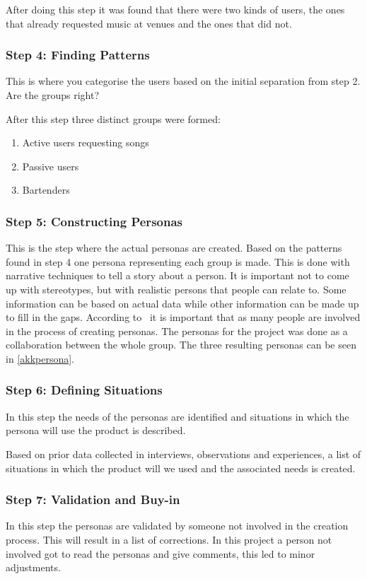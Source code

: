 After doing this step it was found that there were two kinds of users, the ones that already requested music at venues and the ones that did not.

\subsubsection{Step 4: Finding Patterns}
This is where you categorise the users based on the initial separation from step 2. Are the groups right?

After this step three distinct groups were formed:
\begin{enumerate}
    \item Active users requesting songs
    \item Passive users
    \item Bartenders
\end{enumerate}

\subsubsection{Step 5: Constructing Personas}
This is the step where the actual personas are created. Based on the patterns found in step 4 one persona representing each group is made. This is done with narrative techniques to tell a story about a person. It is important not to come up with stereotypes, but with realistic persons that people can relate to. Some information can be based on actual data while other information can be made up to fill in the gaps. According to~\cite{nielsen2007persona} it is important that as many people are involved in the process of creating personas. The personas for the project was done as a collaboration between the whole group. The three resulting personas can be seen in \cref{akkpersona}.

\subsubsection{Step 6: Defining Situations}
In this step the needs of the personas are identified and situations in which the persona will use the product is described.

Based on prior data collected in interviews, observations and experiences, a list of situations in which the product will we used and the associated needs is created.

\subsubsection{Step 7: Validation and Buy-in}
In this step the personas are validated by someone not involved in the creation process. This will result in a list of corrections. In this project a person not involved got to read the personas and give comments, this led to minor adjustments.

